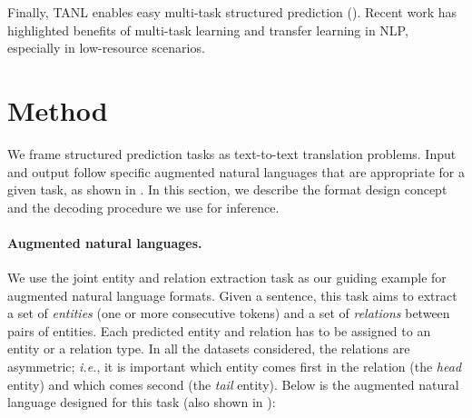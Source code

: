 Finally, TANL enables easy multi-task structured prediction (). Recent work has highlighted benefits of multi-task learning \citep{multitask_learning_sequence_tagging} and transfer learning \citep{transfer-learning-NLP} in NLP, especially in low-resource scenarios.

\section{Method} \label{sec:method}

We frame structured prediction tasks as text-to-text translation problems. 
Input and output follow specific augmented natural languages that are appropriate for a given task, as shown in .
In this section, we describe the format design concept and the decoding procedure we use for inference.

\paragraph{Augmented natural languages.} %
We use the joint entity and relation extraction task as our guiding example for augmented natural language formats.
Given a sentence, this task aims to extract a set of \emph{entities} (one or more consecutive tokens) and a set of \emph{relations} between pairs of entities.
Each predicted entity and relation has to be assigned to an entity or a relation type. %
In all the datasets considered, the relations are asymmetric; {\em i.e.}, it is important which entity comes first in the relation (the \emph{head} entity) and which comes second (the \emph{tail} entity).
Below is the augmented natural language designed for this task (also shown in ):

